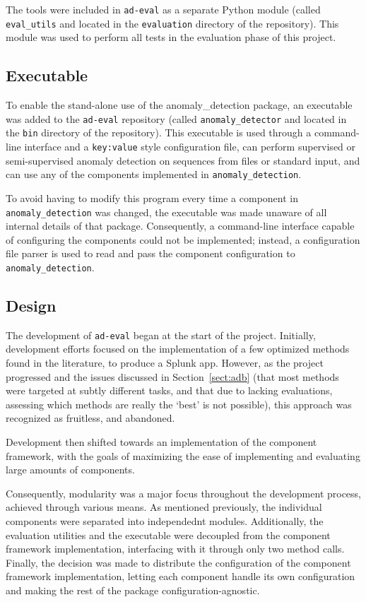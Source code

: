 The tools were included in \texttt{ad-eval} as a separate Python module (called \texttt{eval\_utils} and located in the \texttt{evaluation} directory of the repository). This module was used to perform all tests in the evaluation phase of this project.

\subsection{Executable}
\label{sect:executable}

To enable the stand-alone use of the anomaly\_detection package, an executable was added to the \texttt{ad-eval} repository (called \texttt{anomaly\_detector} and located in the \texttt{bin} directory of the repository). This executable is used through a command-line interface and a \texttt{key:value} style configuration file, can perform supervised or semi-supervised anomaly detection on sequences from files or standard input, and can use any of the components implemented in \texttt{anomaly\_detection}.

To avoid having to modify this program every time a component in \texttt{anomaly\_detection} was changed, the executable was made unaware of all internal details of that package. Consequently, a command-line interface capable of configuring the components could not be implemented; instead, a configuration file parser is used to read and pass the component configuration to \texttt{anomaly\_detection}.

\subsection{Design}
\label{sect:design}

The development of \texttt{ad-eval} began at the start of the project. Initially, development efforts focused on the implementation of a few optimized methods found in the literature, to produce a Splunk app. However, as the project progressed and the issues discussed in Section~\ref{sect:adb} (that most methods were targeted at subtly different tasks, and that due to lacking evaluations, assessing which methods are really the `best' is not possible), this approach was recognized as fruitless, and abandoned.

Development then shifted towards an implementation of the component framework, with the goals of maximizing the ease of implementing and evaluating large amounts of components.

Consequently, modularity was a major focus throughout the development process, achieved through various means. As mentioned previously, the individual components were separated into independednt modules. Additionally, the evaluation utilities and the executable were decoupled from the component framework implementation, interfacing with it through only two method calls. Finally, the decision was made to distribute the configuration of the component framework implementation, letting each component handle its own configuration and making the rest of the package configuration-agnostic.


